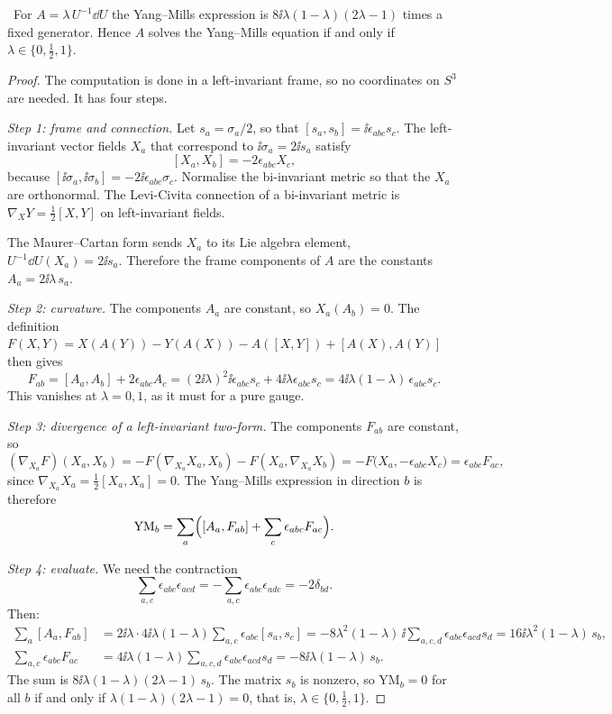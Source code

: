 \begin{theorem}\label{thm:merons}\ver\
For $A=\lambda\,U^{-1}\dd U$ the Yang--Mills expression is $8\ii\lambda(1-\lambda)(2\lambda-1)$ times a fixed generator. Hence $A$ solves the Yang--Mills equation if and only if $\lambda\in\{0,\tfrac12,1\}$.
\end{theorem}
\begin{proof}
The computation is done in a left-invariant frame, so no coordinates on $S^3$ are needed. It has four steps.

\emph{Step 1: frame and connection.} Let $s_a=\sigma_a/2$, so that $[s_a,s_b]=\ii\epsilon_{abc}s_c$. The left-invariant vector fields $X_a$ that correspond to $\ii\sigma_a=2\ii s_a$ satisfy
\[
[X_a,X_b]=-2\epsilon_{abc}X_c ,
\]
because $[\ii\sigma_a,\ii\sigma_b]=-2\ii\epsilon_{abc}\sigma_c$. Normalise the bi-invariant metric so that the $X_a$ are orthonormal. The Levi-Civita connection of a bi-invariant metric is $\nabla_XY=\frac12[X,Y]$ on left-invariant fields.

The Maurer--Cartan form sends $X_a$ to its Lie algebra element, $U^{-1}\dd U(X_a)=2\ii s_a$. Therefore the frame components of $A$ are the constants $A_a=2\ii\lambda\,s_a$.

\emph{Step 2: curvature.} The components $A_a$ are constant, so $X_a(A_b)=0$. The definition $F(X,Y)=X(A(Y))-Y(A(X))-A([X,Y])+[A(X),A(Y)]$ then gives
\[
F_{ab}=[A_a,A_b]+2\epsilon_{abc}A_c=(2\ii\lambda)^2\ii\epsilon_{abc}s_c+4\ii\lambda\epsilon_{abc}s_c=4\ii\lambda(1-\lambda)\,\epsilon_{abc}s_c .
\]
This vanishes at $\lambda=0,1$, as it must for a pure gauge.

\emph{Step 3: divergence of a left-invariant two-form.} The components $F_{ab}$ are constant, so
\[
(\nabla_{X_a}F)(X_a,X_b)=-F(\nabla_{X_a}X_a,X_b)-F(X_a,\nabla_{X_a}X_b)=-F\bigl(X_a,-\epsilon_{abc}X_c\bigr)=\epsilon_{abc}F_{ac},
\]
since $\nabla_{X_a}X_a=\frac12[X_a,X_a]=0$. The Yang--Mills expression in direction $b$ is therefore
\[
\mathrm{YM}_b=\sum_a\Bigl([A_a,F_{ab}]+\sum_c\epsilon_{abc}F_{ac}\Bigr).
\]

\emph{Step 4: evaluate.} We need the contraction
\[
\sum_{a,c}\epsilon_{abc}\epsilon_{acd}=-\sum_{a,c}\epsilon_{abc}\epsilon_{adc}=-2\delta_{bd}.
\]
Then:
\begin{align*}
\sum_a[A_a,F_{ab}]&=2\ii\lambda\cdot4\ii\lambda(1-\lambda)\sum_{a,c}\epsilon_{abc}[s_a,s_c]
=-8\lambda^2(1-\lambda)\,\ii\sum_{a,c,d}\epsilon_{abc}\epsilon_{acd}s_d=16\ii\lambda^2(1-\lambda)\,s_b,\\
\sum_{a,c}\epsilon_{abc}F_{ac}&=4\ii\lambda(1-\lambda)\sum_{a,c,d}\epsilon_{abc}\epsilon_{acd}s_d=-8\ii\lambda(1-\lambda)\,s_b .
\end{align*}
The sum is $8\ii\lambda(1-\lambda)(2\lambda-1)\,s_b$. The matrix $s_b$ is nonzero, so $\mathrm{YM}_b=0$ for all $b$ if and only if $\lambda(1-\lambda)(2\lambda-1)=0$, that is, $\lambda\in\{0,\frac12,1\}$.
\end{proof}


